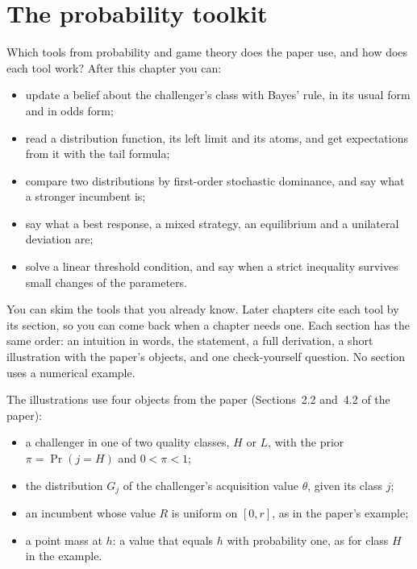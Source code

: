 \chapter{The probability toolkit}\label{ch:toolkit}

\begin{chapterplan}
Which tools from probability and game theory does the paper use, and how does each tool work?
After this chapter you can:
\begin{itemize}
\item update a belief about the challenger's class with Bayes' rule, in its usual form and in odds form;
\item read a distribution function, its left limit and its atoms, and get expectations from it with the tail formula;
\item compare two distributions by first-order stochastic dominance, and say what a stronger incumbent is;
\item say what a best response, a mixed strategy, an equilibrium and a unilateral deviation are;
\item solve a linear threshold condition, and say when a strict inequality survives small changes of the parameters.
\end{itemize}
\end{chapterplan}

You can skim the tools that you already know. Later chapters cite each tool by its section, so you can come back
when a chapter needs one. Each section has the same order: an intuition in words, the statement, a full
derivation, a short illustration with the paper's objects, and one check-yourself question. No section uses
a numerical example.

The illustrations use four objects from the paper (Sections~2.2 and~4.2 of the paper):
\begin{itemize}
\item a challenger in one of two quality classes, \(H\) or \(L\), with the prior \(\pi=\Pr(j=H)\) and \(0<\pi<1\);
\item the distribution \(G_j\) of the challenger's acquisition value \(\theta\), given its class \(j\);
\item an incumbent whose value \(R\) is uniform on \([0,r]\), as in the paper's example;
\item a point mass at \(h\): a value that equals \(h\) with probability one, as for class \(H\) in the example.
\end{itemize}

